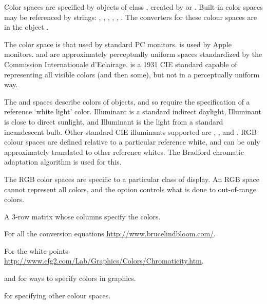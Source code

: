\begin{Details}\relax
Color spaces are specified by objects of class ,
created by  or .
Built-in color spaces may be referenced by strings: ,
, , , ,
. The converters for these colour spaces are in the object
.

The  color space is that used by standard PC monitors.
 is used by Apple monitors.  and
 are approximately perceptually uniform
spaces standardized by the Commission Internationale
d'Eclairage.  is a 1931 CIE standard capable of representing
all visible colors (and then some), but not in a perceptually uniform
way.

The  and  spaces describe colors of objects, and
so require the specification of a reference `white light'
color.  Illuminant  is a standard indirect daylight,
Illuminant  is close to direct sunlight, and Illuminant
 is the light from a standard incandescent bulb. Other
standard CIE illuminants supported are , ,  and
.  RGB colour spaces are defined relative to a particular
reference white, and can be only approximately translated to other
reference whites.  The Bradford chromatic adaptation algorithm is used
for this.

The RGB color spaces are specific to a particular class of display.
An RGB space cannot represent all colors, and the  option
controls what is done to out-of-range colors.
\end{Details}
%
\begin{Value}
A 3-row matrix whose columns specify the colors.
\end{Value}
%
\begin{References}\relax
For all the conversion equations \url{http://www.brucelindbloom.com/}.

For the white points
\url{http://www.efg2.com/Lab/Graphics/Colors/Chromaticity.htm}.
\end{References}
%
\begin{SeeAlso}\relax
{} and  for ways to specify
colors in graphics.

 for specifying other colour spaces.
\end{SeeAlso}
